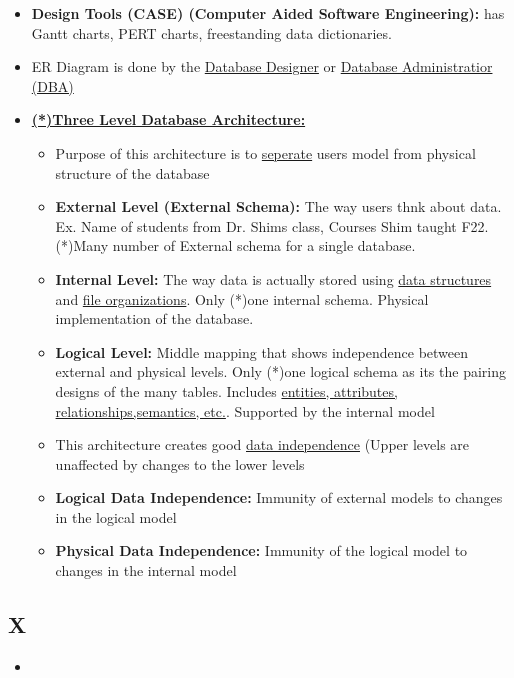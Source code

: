 \documentclass[12pt]{article}
\begin{document}
\begin{itemize}
		  \item \textbf{Design Tools (CASE) (Computer Aided Software Engineering):} has Gantt charts, PERT charts,
					 freestanding data dictionaries.
		  \item ER Diagram is done by the \underline{Database Designer} or 
					 \underline{Database Administratior (DBA)}
		  \item \textbf{\underline{(*)Three Level Database Architecture:}}
					 \begin{itemize}
								\item Purpose of this architecture is to \underline{seperate} users model from physical
										  structure of the database
								\item \textbf{External Level (External Schema):} The way users thnk about data.
										  Ex. Name of students from Dr. Shims class, Courses Shim taught F22. 
										  (*)Many number of External schema for a single database.
								\item \textbf{Internal Level:} The way data is actually stored 
										  using \underline{data structures}
										  and \underline{file organizations}. Only (*)one internal schema. Physical
										  implementation of the database.
								\item \textbf{Logical Level:} Middle mapping that shows independence between
										  external and physical levels. Only (*)one logical schema as its the pairing 
										  designs of the many tables. Includes 
										  \underline{entities, attributes, relationships,semantics, etc.}. Supported
										  by the internal model
								\item This architecture creates good \underline{data independence} (Upper levels
										  are unaffected by changes to the lower levels
								\item \textbf{Logical Data Independence:} Immunity of external models
										  to changes in the logical model
								\item \textbf{Physical Data Independence:} Immunity of the logical model to changes in 
										  the internal model
					 \end{itemize}
\end{itemize}

\subsection*{X}

\begin{itemize}
		  \item \textbf{}
\end{itemize}
\end{document}
